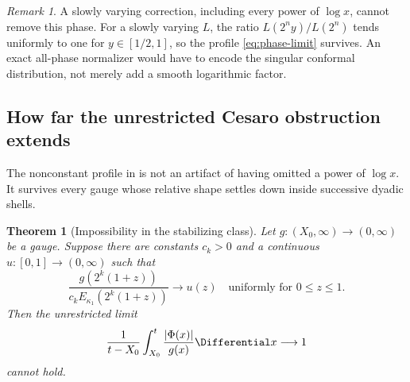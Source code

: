 \documentclass[11pt,oneside]{article}
\newtheorem{theorem}{Theorem}[section]
\theoremstyle{definition}
\theoremstyle{remark}
\newtheorem{remark}[remark]{Remark}
\begin{document}
\begin{remark}
A slowly varying correction, including every power of $\log x$, cannot remove this phase.
For a slowly varying $L$, the ratio $L(2^ny)/L(2^n)$ tends uniformly to one for
$y\in[1/2,1]$, so the profile \eqref{eq:phase-limit} survives.  An exact all-phase
normalizer would have to encode the singular conformal distribution, not merely add a
smooth logarithmic factor.
\end{remark}


\subsection{How far the unrestricted Cesaro obstruction extends}
\label{subsec:stabilizing-gauges}

The nonconstant profile in  is not an artifact of having omitted a
power of $\log x$.  It survives every gauge whose relative shape settles down inside
successive dyadic shells.

\begin{theorem}[Impossibility in the stabilizing class]
\label{thm:stabilizing-impossibility}
Let $g:(X_0,\infty)\to(0,\infty)$ be a gauge.  Suppose there are constants $c_k>0$ and a
continuous $u:[0,1]\to(0,\infty)$ such that
\begin{equation}
 \frac{g(2^k(1+z))}{c_kE_{\kappa_1}(2^k(1+z))}
 \longrightarrow u(z)
 \quad\text{uniformly for }0\le z\le1.
 \label{eq:stabilizing-shape}
\end{equation}
Then the unrestricted limit
\begin{equation}
 \frac1{t-X_0}\int_{X_0}^t\frac{|\Phi(x)|}{g(x)}\Differential x\longrightarrow1
 \label{eq:Q2-final}
\end{equation}
cannot hold.
\end{theorem}
\end{document}
